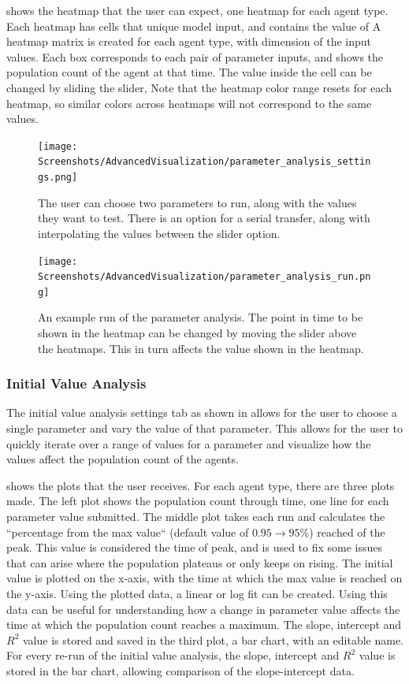  shows the heatmap that the user can expect, one heatmap for each agent type. 
Each heatmap has cells that unique model input, and contains the value of
A heatmap matrix is created for each agent type, with dimension of the input values. 
Each box corresponds to each pair of parameter inputs, and shows the population count of the agent at that time. 
The value inside the cell can be changed by sliding the slider, 
Note that the heatmap color range resets for each heatmap, so similar colors across heatmaps will not correspond to the same values. 
\begin{figure}
    \centering
    \texttt{[image: Screenshots/AdvancedVisualization/parameter\_analysis\_settings.png]}
    \caption{
        The user can choose two parameters to run, along with the values they want to test. 
        There is an option for a serial transfer, along with interpolating the values between the slider option. 
    }
    \label{fig:ss:av:parameter_analysis_settings}
\end{figure}
\begin{figure}
    \centering
    \texttt{[image: Screenshots/AdvancedVisualization/parameter\_analysis\_run.png]}
    \caption{
        An example run of the parameter analysis. 
        The point in time to be shown in the heatmap can be changed by moving the slider above the heatmaps. 
        This in turn affects the value shown in the heatmap. 
    }
    \label{fig:ss:av:parameter_analysis_run}
\end{figure}

\subsubsection{Initial Value Analysis}
The initial value analysis settings tab as shown in allows for the user to choose a single parameter and vary the value of that parameter. 
This allows for the user to quickly iterate over a range of values for a parameter and visualize how the values affect the population count of the agents. 

 shows the plots that the user receives. 
For each agent type, there are three plots made. 
The left plot shows the population count through time, one line for each parameter value submitted. 
The middle plot takes each run and calculates the “percentage from the max value“ (default value of $0.95 \rightarrow 95\%$) reached of the peak. 
This value is considered the time of peak, and is used to fix some issues that can arise where the population plateaus or only keeps on rising. 
The initial value is plotted on the x-axis, with the time at which the max value is reached on the y-axis. 
Using the plotted data, a linear or log fit can be created. 
Using this data can be useful for understanding how a change in parameter value affects the time at which the population count reaches a maximum. 
The slope, intercept and $R^2$ value is stored and saved in the third plot, a bar chart, with an editable name. 
For every re-run of the initial value analysis, the slope, intercept and $R^2$ value is stored in the bar chart, allowing comparison of the slope-intercept data. 

